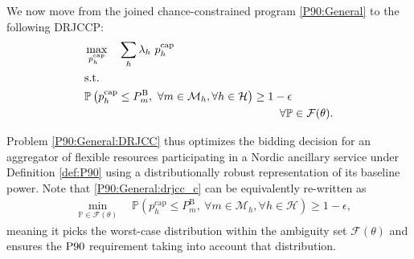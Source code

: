 \documentclass[conference]{IEEEtran}
\begin{document}
We now move from the joined chance-constrained program \eqref{P90:General} to the following \ac{DRJCCP}: 
%
\begin{subequations}\label{P90:General:DRJCC}
    \begin{align}
       & \max_{p_{h}^{\text{cap}}} \quad  \sum_h \lambda_h \ p_{h}^{\text{cap}}                                                                                                                                                                                                     \\
            &\text{s.t.} \nonumber  \\
    &           \mathbb{P}  \left( p_{h}^{\text{cap}} \leq P_{m}^{\text{B}}, \ \forall{m} \in \mathcal{M}_{h},  \forall{h} \in \mathcal{H}  \right) 
         \geq 1 - \epsilon \notag\\
        & \hspace{6.1cm} \forall{\mathbb{P}} \in \mathcal{F}(\theta). \label{P90:General:drjcc_c}
    \end{align}
\end{subequations}

Problem \eqref{P90:General:DRJCC} thus optimizes the bidding decision for an aggregator of flexible resources participating in a Nordic ancillary service under Definition \ref{def:P90} using a distributionally robust representation of its baseline power. Note that \eqref{P90:General:drjcc_c} can be equivalently re-written as 
    \begin{align}
    &     \min_{\mathbb{P} \in \mathcal{F}(\theta)} \quad       \mathbb{P}  \left( p_{h}^{\text{cap}} \leq P_{m}^{\text{B}}, \ \forall{m} \in \mathcal{M}_{h},  \forall{h} \in \mathcal{H}  \right) 
         \geq 1 - \epsilon, \label{P90:General:drjcc_c2}
    \end{align}
meaning it picks the worst-case distribution within the ambiguity set $\mathcal{F}(\theta)$ and ensures the $\rm{P90}$ requirement taking into account that distribution. 


\vspace{2mm}
\end{document}
